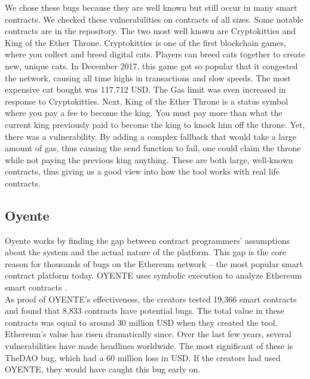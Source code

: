 We chose these bugs because they are well known but still occur in many smart contracts. We checked these vulnerabilities on contracts of all sizes. Some notable contracts are in the repository. The two most well known are Cryptokitties and King of the Ether Throne. Cryptokitties is one of the first blockchain games, where you collect and breed digital cats. Players can breed cats together to create new, unique cats. In December 2017, this game got so popular that it congested the network, causing all time highs in transactions and slow speeds. The most expensive cat bought was 117,712 USD. The Gas limit was even increased in response to Cryptokitties. Next, King of the Ether Throne is a status symbol where you pay a fee to become the king. You must pay more than what the current king previously paid to become the king to knock him off the throne. Yet, there was a vulnerability. By adding a complex fallback that would take a large amount of gas, thus causing the send function to fail, one could claim the throne while not paying the previous king anything. These are both large, well-known contracts, thus giving us a good view into how the tool works with real life contracts.


\subsection*{Oyente}
Oyente works by finding the gap between contract programmers' assumptions about the system and the actual nature of the platform. This gap is the core reason for thousands of bugs on the Ethereum network -- the most popular smart contract platform today. OYENTE uses symbolic execution to analyze Ethereum smart contracts \cite{luu2016making}. \\

As proof of OYENTE's effectiveness, the creators tested 19,366 smart contracts and found that 8,833 contracts have potential bugs. The total value in these contracts was equal to around 30 million USD when they created the tool. Ethereum's value has risen dramatically since. Over the last few years, several vulnerabilities have made headlines worldwide. The most significant of these is TheDAO bug, which had a 60 million loss in USD. If the creators had used OYENTE, they would have caught this bug early on. \\

